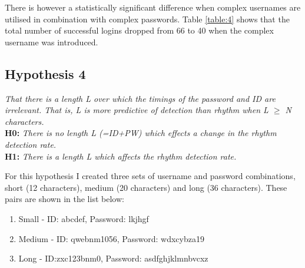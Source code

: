 \documentclass{article}
\begin{document}
There is however a statistically significant difference when complex usernames are utilised in combination with complex passwords. Table \ref{table:4} shows that the total number of successful logins dropped from 66 to 40 when the complex username was introduced.   


\subsection{Hypothesis 4}
\begin{center}
\textit{That there is a length L over which the timings of the password and ID are
irrelevant. That is, L is more predictive of detection than rhythm when L $\geq$ N characters.} \newline \\

\textbf{H0:} \textit{There	is	no	length	L	(=ID+PW) which	effects	a	change	in	the	rhythm detection	rate.} \newline \\

\textbf{H1:} \textit{There	is	a	length	L	which	affects	the	rhythm	detection	rate.}
\end{center}

For this hypothesis I created three sets of username and password combinations, short (12 characters), medium (20 characters) and long (36 characters). These pairs are shown in the list below: 

\begin{enumerate}
    \item Small - ID: abcdef, Password: lkjhgf
    \item Medium - ID: qwebnm1056, Password: wdxcybza19
    \item Long - ID:zxc123bnm0, Password: asdfghjklmnbvcxz
\end{enumerate}
\end{document}
